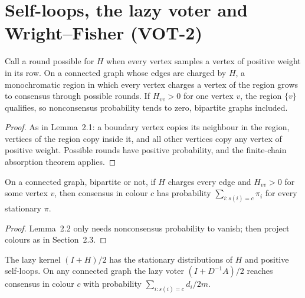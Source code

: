 \section{Self-loops, the lazy voter and Wright--Fisher (VOT-2)}
\begin{lemma}\label{lem:kernel-propagation}
\leanok{}
Call a round possible for $H$ when every vertex samples a vertex of positive weight in its
row. On a connected graph whose edges are charged by $H$, a monochromatic region in which
every vertex charges a vertex of the region grows to consensus through possible rounds.
If $H_{vv}>0$ for one vertex $v$, the region $\{v\}$ qualifies, so nonconsensus probability
tends to zero, bipartite graphs included.
\end{lemma}
\begin{proof}\leanok
As in Lemma~2.1: a boundary vertex copies its neighbour in the region, vertices of the region
copy inside it, and all other vertices copy any vertex of positive weight. Possible rounds
have positive probability, and the finite-chain absorption theorem applies.
\end{proof}
\begin{theorem}[Remark, p.~254]\label{thm:selfloop}
\leanok{}
On a connected graph, bipartite or not, if $H$ charges every edge and $H_{vv}>0$ for some
vertex $v$, then consensus in colour $c$ has probability $\sum_{i:s(i)=c}\pi_i$ for every
stationary $\pi$.
\end{theorem}
\begin{proof}\leanok
Lemma~2.2 only needs nonconsensus probability to vanish; then project colours as in
Section~2.3.
\end{proof}
\begin{theorem}\label{thm:lazy}
\leanok{}
The lazy kernel $(I+H)/2$ has the stationary distributions of $H$ and positive self-loops.
On any connected graph the lazy voter $(I+D^{-1}A)/2$ reaches consensus in colour $c$ with
probability $\sum_{i:s(i)=c} d_i/2m$.
\end{theorem}
